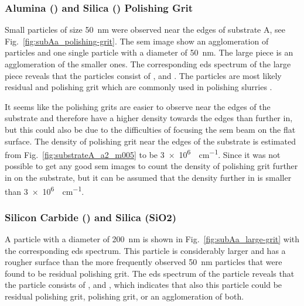 \subsubsection{Alumina () and Silica () Polishing Grit}
Small particles of size \SI{50}{\nano\metre} were observed near the edges of substrate A, see Fig.~\ref{fig:subAa_polishing-grit}. The \ac{sem} image show an agglomeration of particles and one single particle with a diameter of \SI{50}{\nano\metre}. The large piece is an agglomeration of the smaller ones. The corresponding \ac{eds} spectrum of the large piece reveals that the particles consist of ,  and . The particles are most likely residual  and  polishing grit which are commonly used in polishing slurries \citep{benson2015as-received}. 

It seems like the polishing grits are easier to observe near the edges of the substrate and therefore have a higher density towards the edges than further in, but this could also be due to the difficulties of focusing the \ac{sem} beam on the flat surface. The density of polishing grit near the edges of the substrate is estimated from Fig.~\ref{fig:substrateA_a2_m005} to be \SI{3e6}{\particle\centi\metre^{-1}}. Since it was not possible to get any good \ac{sem} images to count the density of polishing grit further in on the substrate, but it can be assumed that the density further in is smaller than \SI{3e6}{\particle\centi\metre^{-1}}.

\begin{comment}
\begin{figure}[htbp]
    \centering
    \subfigure[SEM image at a magnification of 150000$\times$.]{\texttt{[image: substrateA\_a2\_m006.jpg]}\label{fig:substrateA_a2_m006}}
    \subfigure[EDS.]{\texttt{[image: subA\_eds\_alumina02.jpg]}\label{fig:subA_eds_alumina02}}
    \caption[ SEM image and EDS spectrum of a particle on substrate A.]{High resolution scanning electron microscopy (SEM) image of one large and small piece of particles on substrate A and the corresponding \acf{eds} spectrum of the large piece.}
    \label{fig:subA_alumina}
\end{figure}
\end{comment}

\subsubsection{Silicon Carbide () and Silica (SiO2)}
A particle with a diameter of \SI{200}{\nano\metre} is shown in Fig.~\ref{fig:subAa_large-grit} with the corresponding \ac{eds} spectrum. This particle is considerably larger and has a rougher surface than the more frequently observed \SI{50}{\nano\metre} particles that were found to be residual polishing grit. The \ac{eds} spectrum of the particle reveals that the particle consists of ,  and , which indicates that also this particle could be residual  polishing grit,  polishing grit, or an agglomeration of both. 

